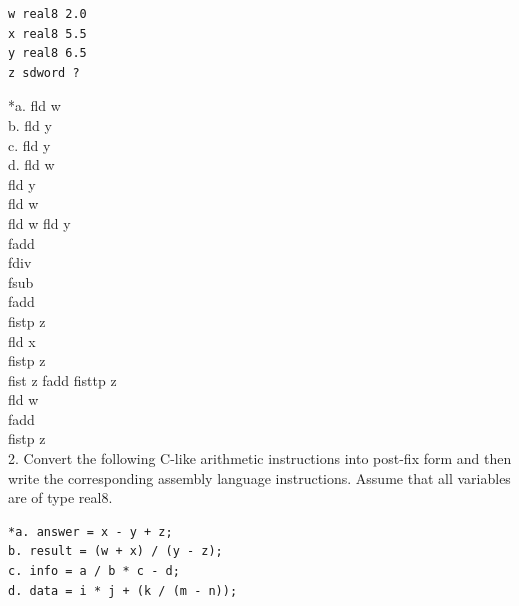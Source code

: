 \documentclass[10pt]{book}
\begin{document}
\begin{center}
\begin{center}
\begin{center}
\begin{center}
\begin{verbatim}
w real8 2.0
x real8 5.5
y real8 6.5
z sdword ?
\end{verbatim}

*a. fld w\\
b. fld y\\
c. fld y\\
d. fld w\\
fld y\\
fld w\\
fld w fld y\\
fadd\\
fdiv\\
fsub\\
fadd\\
fistp z\\
fld x\\
fistp z\\
fist z fadd fisttp z\\
fld w\\
fadd\\
fistp z\\
2. Convert the following C-like arithmetic instructions into post-fix form and then write the corresponding assembly language instructions. Assume that all variables are of type real8.

\begin{verbatim}
*a. answer = x - y + z;
b. result = (w + x) / (y - z);
c. info = a / b * c - d;
d. data = i * j + (k / (m - n));
\end{verbatim}


\end{center}
\end{center}
\end{center}
\end{center}
\end{document}
